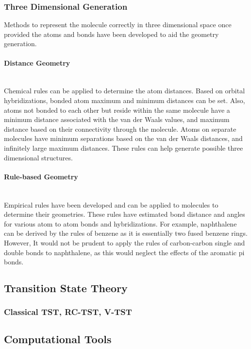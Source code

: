 \documentclass[12pt]{article}
\begin{document}
\subsubsection{Three Dimensional Generation}

Methods to represent the molecule correctly in three dimensional space once provided the atoms and bonds have been developed to aid the geometry generation. 

\paragraph{Distance Geometry}\mbox{}\\

Chemical rules can be applied to determine the atom distances. Based on orbital hybridizations, bonded atom maximum and minimum distances can be set. Also, atoms not bonded to each other but reside within the same molecule have a minimum distance associated with the van der Waals values, and maximum distance based on their connectivity through the molecule. Atoms on separate molecules have minimum separations based on the van der Waals distances, and infinitely large maximum distances. These rules can help generate possible three dimensional structures.

\paragraph{Rule-based Geometry}\mbox{}\\

Empirical rules have been developed and can be applied to molecules to determine their geometries. These rules have estimated bond distance and angles for various atom to atom bonds and hybridizations. For example, naphthalene can be derived by the rules of benzene as it is essentially two fused benzene rings. However, It would not be prudent to apply the rules of carbon-carbon single and double bonds to naphthalene, as this would neglect the effects of the aromatic pi bonds.

\subsection{Transition State Theory}
\subsubsection{Classical TST, RC-TST, V-TST}

\subsection{Computational Tools}
\end{document}
